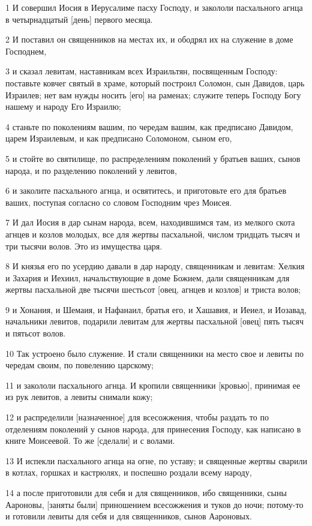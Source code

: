 \par 1 И совершил Иосия в Иерусалиме пасху Господу, и закололи пасхального агнца в четырнадцатый [день] первого месяца.
\par 2 И поставил он священников на местах их, и ободрял их на служение в доме Господнем,
\par 3 и сказал левитам, наставникам всех Израильтян, посвященным Господу: поставьте ковчег святый в храме, который построил Соломон, сын Давидов, царь Израилев; нет вам нужды носить [его] на раменах; служите теперь Господу Богу нашему и народу Его Израилю;
\par 4 станьте по поколениям вашим, по чередам вашим, как предписано Давидом, царем Израилевым, и как предписано Соломоном, сыном его,
\par 5 и стойте во святилище, по распределениям поколений у братьев ваших, сынов народа, и по разделению поколений у левитов,
\par 6 и заколите пасхального агнца, и освятитесь, и приготовьте его для братьев ваших, поступая согласно со словом Господним чрез Моисея.
\par 7 И дал Иосия в дар сынам народа, всем, находившимся там, из мелкого скота агнцев и козлов молодых, все для жертвы пасхальной, числом тридцать тысяч и три тысячи волов. Это из имущества царя.
\par 8 И князья его по усердию давали в дар народу, священникам и левитам: Хелкия и Захария и Иехиил, начальствующие в доме Божием, дали священникам для жертвы пасхальной две тысячи шестьсот [овец, агнцев и козлов] и триста волов;
\par 9 и Хонания, и Шемаия, и Нафанаил, братья его, и Хашавия, и Иеиел, и Иозавад, начальники левитов, подарили левитам для жертвы пасхальной [овец] пять тысяч и пятьсот волов.
\par 10 Так устроено было служение. И стали священники на место свое и левиты по чередам своим, по повелению царскому;
\par 11 и закололи пасхального агнца. И кропили священники [кровью], принимая ее из рук левитов, а левиты снимали кожу;
\par 12 и распределили [назначенное] для всесожжения, чтобы раздать то по отделениям поколений у сынов народа, для принесения Господу, как написано в книге Моисеевой. То же [сделали] и с волами.
\par 13 И испекли пасхального агнца на огне, по уставу; и священные жертвы сварили в котлах, горшках и кастрюлях, и поспешно роздали всему народу,
\par 14 а после приготовили для себя и для священников, ибо священники, сыны Аароновы, [заняты были] приношением всесожжения и туков до ночи; потому-то и готовили левиты для себя и для священников, сынов Аароновых.
